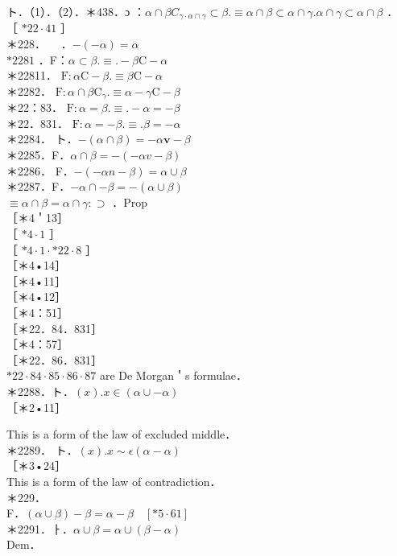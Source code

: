 \documentclass[10pt]{article}
\begin{document}
ト．（1）．（2）．＊438．ɔ ：$\alpha \cap \beta C_{\gamma \cdot \alpha \cap \gamma} \subset \beta . \equiv \alpha \cap \beta \subset \alpha \cap \gamma . \alpha \cap \gamma \subset \alpha \cap \beta$ ．\\
［ $* 22 \cdot 41$ ］\\
＊228．$\quad$ ．$-(-\alpha)=\alpha$\\
$* 2281$ ．F：$\alpha \subset \beta . \equiv .-\beta \mathrm{C}-\alpha$\\
＊22811． $\mathrm{F}: \alpha \mathrm{C}-\beta . \equiv \beta \mathrm{C}-\alpha$\\
＊2282． $\mathrm{F}: \alpha \cap \beta \mathrm{C}_{\gamma} . \equiv \alpha-\gamma \mathrm{C}-\beta$\\
＊22：83． $\mathrm{F}: \alpha=\beta . \equiv .-\alpha=-\beta$\\
＊22．831． $\mathrm{F}: \alpha=-\beta . \equiv . \beta=-\alpha$\\
＊2284． ト．$-(\alpha \cap \beta)=-\alpha \mathbf{v}-\beta$\\
＊2285．F．$\alpha \cap \beta=-(-\alpha v-\beta)$\\
＊2286． F．$-(-\alpha n-\beta)=\alpha \cup \beta$\\
＊2287．F．$-\alpha \cap-\beta=-(\alpha \cup \beta)$\\
$\equiv \alpha \cap \beta=\alpha \cap \gamma: \supset$ ．Prop\\
［＊4＇13］\\
［ $* 4 \cdot 1$ ］\\
［ $* 4 \cdot 1 \cdot * 22 \cdot 8$ ］\\
［＊4•14］\\
［＊4•11］\\
［＊4•12］\\
［＊4：51］\\
［＊22．84．831］\\
［＊4：57］\\
［＊22．86．831］\\
$* 22 \cdot 84 \cdot 85 \cdot 86 \cdot 87$ are De Morgan＇s formulae．\\
＊2288．ト．$(x) . x \in(\alpha \cup-\alpha)$\\
［＊2•11］

This is a form of the law of excluded middle．\\
＊2289． ト．$(x) . x \sim \epsilon(\alpha-\alpha)$\\
［＊3•24］\\
This is a form of the law of contradiction．\\
＊229．\\
F．$(\alpha \cup \beta)-\beta=\alpha-\beta \quad[* 5 \cdot 61]$\\
＊2291．ㅏ．$\alpha \cup \beta=\alpha \cup(\beta-\alpha)$\\
Dem．
\end{document}
